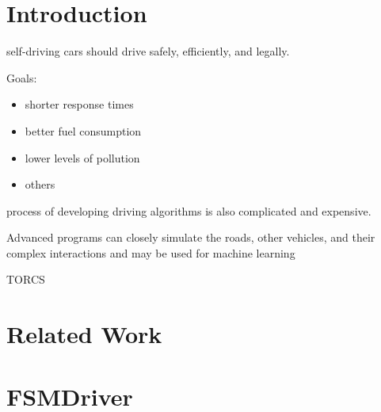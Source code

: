 \documentclass{UnBeamer}%
\begin{document}
\section{Introduction}%
\begin{frame}%
	self-driving cars should drive safely, efficiently, and legally.

	Goals:
	\begin{itemize}
		\item shorter response times
		\item better fuel consumption
		\item lower levels of pollution
		\item others
	\end{itemize}
\end{frame}%

\begin{frame}%
	process of developing driving algorithms is also complicated and expensive.

	Advanced programs can closely simulate the roads, other vehicles, and their complex interactions and may be used for machine learning

	TORCS
\end{frame}%

\section{Related Work}%
\begin{frame}%

\end{frame}%

\section{FSMDriver}%
\begin{frame}%

\end{frame}%

\end{document}
